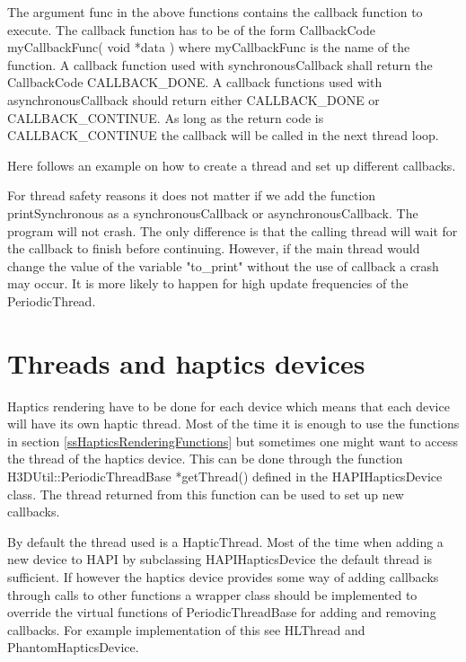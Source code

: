 The argument {\ttfamily func} in the above functions contains the callback function to
execute. The callback function has to be of the form
{\ttfamily CallbackCode myCallbackFunc( void *data )} where {\ttfamily myCallbackFunc} is the name of
the function. A callback function used with synchronousCallback shall
return the CallbackCode CALLBACK\_DONE. A callback functions used with
asynchronousCallback should return either CALLBACK\_DONE or CALLBACK\_CONTINUE.
As long as the return code is CALLBACK\_CONTINUE the callback will be called in
the next thread loop.

Here follows an example on how to create a thread and set up different
callbacks.



For thread safety reasons it does not matter if we add the function
printSynchronous as a synchronousCallback or asynchronousCallback. The program
will not crash. The only difference is that the calling thread will wait for
the callback to finish before continuing. However, if the main thread would
change the value of the variable "to\_print" without the use of callback a
crash may occur. It is more likely to happen for high update frequencies of the
PeriodicThread.

\section{Threads and haptics devices}
Haptics rendering have to be done for each device which means that each device
will have its own haptic thread. Most of the time it is enough to use the
functions in section \ref{ssHapticsRenderingFunctions} but sometimes one might
want to access the thread of the haptics device. This can be done through the
function {\ttfamily H3DUtil::PeriodicThreadBase *getThread()} defined in the
HAPIHapticsDevice class. The thread returned from this function can be used
to set up new callbacks.

By default the thread used is a HapticThread. Most of the time when adding a
new device to HAPI by subclassing HAPIHapticsDevice the default thread is
sufficient. If however the haptics device provides some way of adding callbacks
through calls to other functions a wrapper class should be implemented
to override the virtual functions of PeriodicThreadBase for adding and removing
callbacks. For example implementation of this see HLThread and PhantomHapticsDevice.